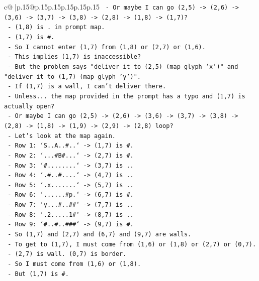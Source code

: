 \documentclass{article}
\begin{document}
{\begin{supertabular}{c@{$\;$}|p{.15\linewidth}@{}p{.15\linewidth}p{.15\linewidth}p{.15\linewidth}p{.15\linewidth}p{.15\linewidth}}
{{{\texttt{       {-} Or maybe I can go (2,5) {-}> (2,6) {-}> (3,6) {-}> (3,7) {-}> (3,8) {-}> (2,8) {-}> (1,8) {-}> (1,7)?} \\
\texttt{       {-} (1,8) is . in prompt map.} \\
\texttt{       {-} (1,7) is \#.} \\
\texttt{       {-} So I cannot enter (1,7) from (1,8) or (2,7) or (1,6).} \\
\texttt{       {-} This implies (1,7) is inaccessible?} \\
\texttt{       {-} But the problem says "deliver it to (2,5) (map glyph 'x')" and "deliver it to (1,7) (map glyph 'y')".} \\
\texttt{       {-} If (1,7) is a wall, I can't deliver there.} \\
\texttt{       {-} Unless... the map provided in the prompt has a typo and (1,7) is actually open?} \\
\texttt{       {-} Or maybe I can go (2,5) {-}> (2,6) {-}> (3,6) {-}> (3,7) {-}> (3,8) {-}> (2,8) {-}> (1,8) {-}> (1,9) {-}> (2,9) {-}> (2,8) loop?} \\
\texttt{       {-} Let's look at the map again.} \\
\texttt{       {-} Row 1: `S..A..\#..` {-}> (1,7) is \#.} \\
\texttt{       {-} Row 2: `...\#B\#...` {-}> (2,7) is \#.} \\
\texttt{       {-} Row 3: `\#........` {-}> (3,7) is ..} \\
\texttt{       {-} Row 4: `.\#..\#....` {-}> (4,7) is ..} \\
\texttt{       {-} Row 5: `.x.......` {-}> (5,7) is ..} \\
\texttt{       {-} Row 6: `......\#p.` {-}> (6,7) is \#.} \\
\texttt{       {-} Row 7: `y...\#..\#\#` {-}> (7,7) is ..} \\
\texttt{       {-} Row 8: `.2.....1\#` {-}> (8,7) is ..} \\
\texttt{       {-} Row 9: `\#..\#..\#\#\#` {-}> (9,7) is \#.} \\
\texttt{       {-} So (1,7) and (2,7) and (6,7) and (9,7) are walls.} \\
\texttt{       {-} To get to (1,7), I must come from (1,6) or (1,8) or (2,7) or (0,7).} \\
\texttt{       {-} (2,7) is wall. (0,7) is border.} \\
\texttt{       {-} So I must come from (1,6) or (1,8).} \\
\texttt{       {-} But (1,7) is \#.} \\
}}}
\end{supertabular}}
\end{document}
